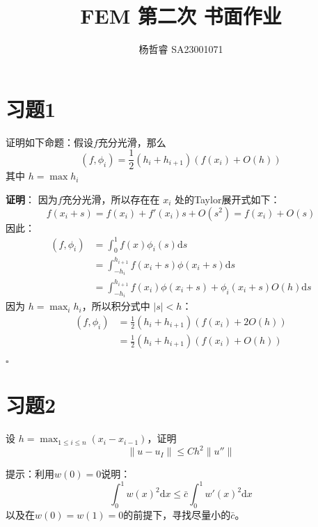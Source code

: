 \documentclass[11pt]{ctexart}
\title{FEM 第二次 书面作业}
\author{杨哲睿 SA23001071}
\begin{document}
\maketitle
\section{习题1}
证明如下命题：假设$f$充分光滑，那么
\begin{equation}
  (f, \phi_i) = \frac{1}{2} (h_i + h_{i+1}) (f(x_i) + O(h))
\end{equation}
其中 $h = \max h_i$

{\flushleft \textbf{证明}：} 因为$f$充分光滑，所以存在在 $x_i$ 处的Taylor展开式如下：
\begin{equation}
  f(x_i + s) = f(x_i) + f'(x_i) s + O(s^2) = f(x_i) + O(s)
\end{equation}
因此：
\begin{equation}
  \begin{aligned}
    (f, \phi_i) & = \int_0^1 f(x) \phi_i(s) \mathrm ds\\
     & = \int_{-h_i}^{h_{i+1}} f(x_i + s) \phi(x_i + s) \mathrm ds \\
     & = \int_{-h_i}^{h_{i+1}} f(x_i) \phi(x_i + s) + \phi_i(x_i + s) O(h) \mathrm ds
  \end{aligned}
\end{equation}
因为 $h = \max_i h_i$，所以积分式中 $| s | < h$：
\begin{equation}
  \begin{aligned}
    (f, \phi_i) & = \frac{1}{2}(h_i+h_{i+1}) (f(x_i) + 2 O(h))\\
    & = \frac{1}{2}(h_i+h_{i+1}) (f(x_i) + O(h))
  \end{aligned}
\end{equation}

\begin{flushright}
$\square$
\end{flushright}

\section{习题2}

设 $h = \max_{1 \le i \le n} (x_i - x_{i-1})$，证明
\begin{equation}
  \| u - u_I \| \le C h^2 \| u''\|
\end{equation}

提示：利用$w(0) = 0$说明：
\begin{equation}
  \int_0^1 w(x)^2 \mathrm dx \le \bar{c} \int_0^1 w'(x)^2 \mathrm dx 
\end{equation}
以及在$w(0) = w(1) = 0$的前提下，寻找尽量小的$\bar{c}$。
\end{document}
